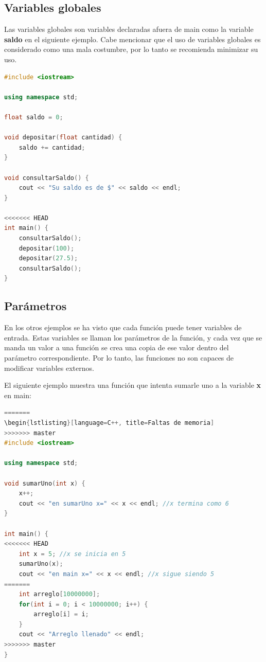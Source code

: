 \documentclass{article}
\begin{document}
\subsection{Variables globales}

Las variables globales son variables declaradas afuera de main como la variable \textbf{saldo} en el siguiente ejemplo. Cabe mencionar que el uso de variables globales es considerado como una mala costumbre, por lo tanto se recomienda minimizar su uso.

\begin{lstlisting}[language=C++, title=Variables globales]
#include <iostream>

using namespace std;

float saldo = 0;

void depositar(float cantidad) {
	saldo += cantidad;
}

void consultarSaldo() {
	cout << "Su saldo es de $" << saldo << endl;
}

<<<<<<< HEAD
int main() {
	consultarSaldo();
	depositar(100);
	depositar(27.5);
	consultarSaldo();
}
\end{lstlisting}

\subsection{Parámetros}

En los otros ejemplos se ha visto que cada función puede tener variables de entrada. Estas variables se llaman los parámetros de la función, y cada vez que se manda un valor a una función se crea una copia de ese valor dentro del parámetro correspondiente. Por lo tanto, las funciones no son capaces de modificar variables externos.

El siguiente ejemplo muestra una función que intenta sumarle uno a la variable \textbf{x} en main:

\begin{lstlisting}[language=C++, title=Parámetros]
=======
\begin{lstlisting}[language=C++, title=Faltas de memoria]
>>>>>>> master
#include <iostream>

using namespace std;

void sumarUno(int x) {
	x++;
	cout << "en sumarUno x=" << x << endl; //x termina como 6
}

int main() {
<<<<<<< HEAD
	int x = 5; //x se inicia en 5
	sumarUno(x);
	cout << "en main x=" << x << endl; //x sigue siendo 5
=======
	int arreglo[10000000];
	for(int i = 0; i < 10000000; i++) {
		arreglo[i] = i;
	}
	cout << "Arreglo llenado" << endl;
>>>>>>> master
}
\end{lstlisting}
\end{document}
